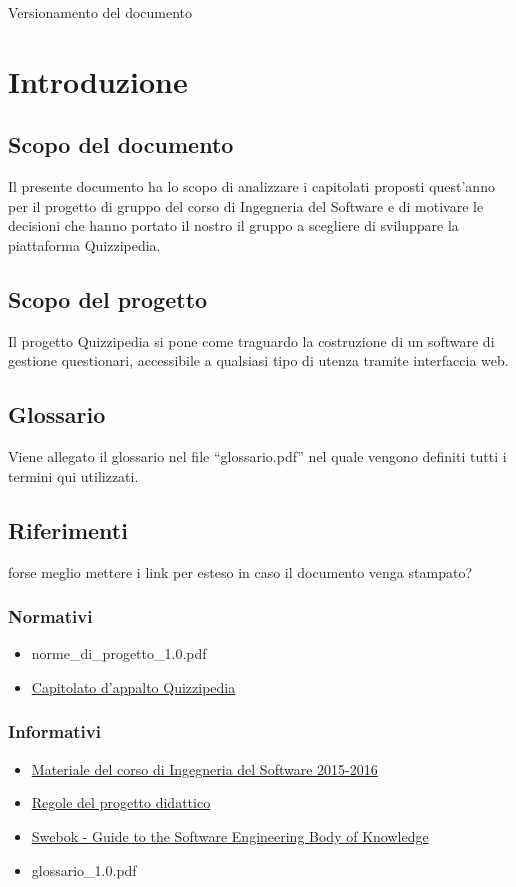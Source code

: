 \documentclass[a4paper,11pt]{article}
\begin{document}
			\caption{Versionamento del documento} 
		\fineregistro
	
\newpage
	\fancyhead[R]{\leftmark}
	\tableofcontents
	\newpage

\section{Introduzione}

\subsection{Scopo del documento}
Il presente documento ha lo scopo di analizzare i capitolati proposti quest'anno per il progetto di gruppo del corso di Ingegneria del Software e di motivare le decisioni che hanno portato il nostro il gruppo a scegliere di sviluppare la piattaforma Quizzipedia.
\subsection{Scopo del progetto}
Il progetto Quizzipedia si pone come traguardo la costruzione di un software di gestione questionari, accessibile a qualsiasi tipo di utenza tramite interfaccia web.
\subsection{Glossario}
Viene allegato il glossario nel file “glossario.pdf” nel quale vengono definiti tutti i
termini qui utilizzati.
\subsection{Riferimenti}
forse meglio mettere i link per esteso in caso il documento venga stampato?
\subsubsection{Normativi}
\begin{itemize}
	\item norme\_di\_progetto\_1.0.pdf
	\item \href{http://www.math.unipd.it/~tullio/IS-1/2015/Progetto/C5.pdf}{Capitolato d'appalto Quizzipedia}	
\end{itemize}
\subsubsection{Informativi}
\begin{itemize}
	\item \href{http://www.math.unipd.it/~tullio/IS-1/2015/}{Materiale del corso di Ingegneria del Software 2015-2016}
	\item \href{http://www.math.unipd.it/~tullio/IS-1/2015/Dispense/PD01.pdf}{Regole del progetto didattico}
	\item \href{http://www.computer.org/web/swebok/index}{Swebok - Guide to the Software Engineering Body of Knowledge}
	\item glossario\_1.0.pdf
\end{itemize}
\end{document}
